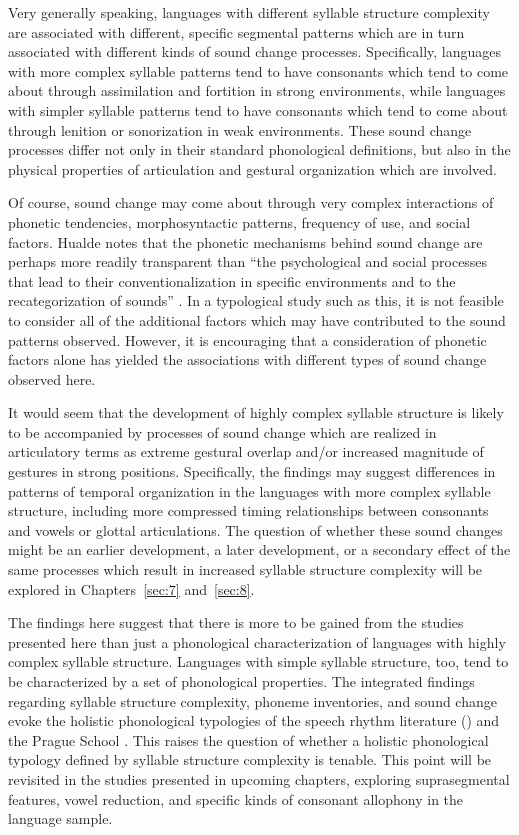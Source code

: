   Very generally speaking, languages with different syllable structure complexity are associated with different, specific segmental patterns which are in turn associated with different kinds of sound change processes. Specifically, languages with more complex syllable patterns tend to have consonants which tend to come about through assimilation and fortition in strong environments, while languages with simpler syllable patterns tend to have consonants which tend to come about through lenition or sonorization in weak environments. These sound change processes differ not only in their standard phonological definitions, but also in the physical properties of articulation and gestural organization which are involved.

  Of course, sound change may come about through very complex interactions of phonetic tendencies, morphosyntactic patterns, frequency of use, and social factors. Hualde notes that the phonetic mechanisms behind sound change are perhaps more readily transparent than “the psychological and social processes that lead to their conventionalization in specific environments and to the recategorization of sounds” \citep[2222]{Hualde2011}. In a typological study such as this, it is not feasible to consider all of the additional factors which may have contributed to the sound patterns observed. However, it is encouraging that a consideration of phonetic factors alone has yielded the associations with different types of sound change observed here.

  It would seem that the development of highly complex syllable structure is likely to be accompanied by processes of sound change which are realized in articulatory terms as extreme gestural overlap and/or increased magnitude of gestures in strong positions. Specifically, the findings may suggest differences in patterns of temporal organization in the languages with more complex syllable structure, including more compressed timing relationships between consonants and vowels or glottal articulations. The question of whether these sound changes might be an earlier development, a later development, or a secondary effect of the same processes which result in increased syllable structure complexity will be explored in Chapters~\ref{sec:7} and~\ref{sec:8}.

  The findings here suggest that there is more to be gained from the studies presented here than just a phonological characterization of languages with highly complex syllable structure. Languages with simple syllable structure, too, tend to be characterized by a set of phonological properties. The integrated findings regarding syllable structure complexity, phoneme inventories, and sound change evoke the holistic phonological typologies of the speech rhythm literature (\citealt{Roach1982,Dauer1983,Auer1993}) and the Prague School \citep{Isačenko1939/1940}. This raises the question of whether a holistic phonological typology defined by syllable structure complexity is tenable. This point will be revisited in the studies presented in upcoming chapters, exploring suprasegmental features, vowel reduction, and specific kinds of consonant allophony in the language sample.

